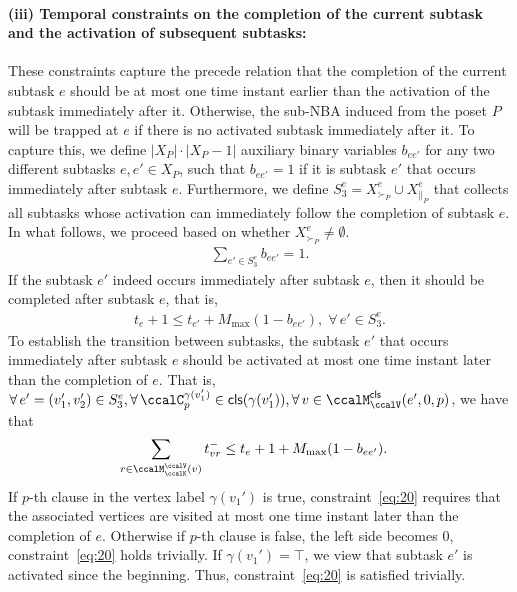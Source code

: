 \documentclass[Afour,sageh,times]{sagej}
\newcommand{\clause}[1]{\mathsf{cls}(#1)}
\newcounter{phase} \setcounter{phase}{0}
\newcounter{subphase}[phase] \setcounter{subphase}{0}
\begin{document}
{{{{{\paragraph{(iii)  Temporal constraints on  the  completion of the current subtask and the activation  of subsequent subtasks:}
These constraints capture the precede relation that the completion of the current subtask $e$ should be at most one time instant earlier than the activation of the subtask immediately after it. Otherwise, the sub-NBA induced from the poset $P$ will be trapped at $e$ if there is no activated subtask immediately after it. To capture this, we define $|X_P|\cdot |X_P -1|$ auxiliary binary variables $b_{ee'}$ for any two different subtasks  $e, e' \in X_P$,  such that $b_{ee'}=1$  if it is subtask $e'$ that occurs immediately after subtask $e$. Furthermore, we define  $S_3^e = X^e_{\succ_{P}} \cup X^e_{\|_{P}}$ that collects all subtasks whose activation can immediately follow the completion of subtask $e$.  In what follows, we proceed based on whether $ X^e_{\succ_{P}} \neq \emptyset$.
\label{activation:a}
\begin{align}\label{eq:bafter}
 \sum_{e'\in  S_3^e} b_{ee'} = 1.
\end{align}
If the subtask $e'$ indeed occurs immediately  after subtask $e$, then it should be completed after subtask $e$, that is,
\begin{align}\label{eq:after}
  t_e + 1 \leq  t_{e'} + M_{\text{max}} (1 - b_{ee'}),\; \forall\, e' \in S_3^e.
\end{align}
To establish the transition between subtasks, the subtask $e'$ that occurs immediately  after subtask $e$ should be activated at most one time instant later than the completion of $e$. That is, $\forall\, e' = (v_1', v_2') \in S_3^e, \forall \, \ccalC_p^{\gamma(v'_1)} \in \clause{\gamma(v'_1)} , \forall \,v \in \ccalM^\mathsf{cls}_\ccalV(e',0,p)$, we have that
\begin{align}\label{eq:20}
  & \sum_{r\in \ccalM^\ccalV_{\ccalK}(v)} t_{vr}^-   \leq t_{e}  + 1 + M_{\text{max}} (1 - b_{ee'}).
\end{align}
If $p$-th clause in the vertex label $\gamma(v_1')$ is true, constraint~\eqref{eq:20} requires that the associated vertices are visited at most one time instant later than the completion of $e$. Otherwise if $p$-th clause is false, the left side becomes 0, constraint~\eqref{eq:20} holds trivially. If $\gamma(v_1')=\top$, we view that subtask $e'$ is activated since the beginning. Thus, constraint~\eqref{eq:20} is satisfied trivially.

}}}}}
\end{document}
